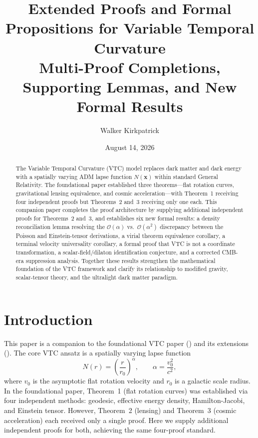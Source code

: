\documentclass[11pt,a4paper]{article}
\title{\textbf{Extended Proofs and Formal Propositions for Variable Temporal Curvature}\\[0.5em]
\large Multi-Proof Completions, Supporting Lemmas, and New Formal Results}
\author{Walker Kirkpatrick}
\date{August 14, 2026}
\theoremstyle{definition}
\begin{document}
\maketitle

\begin{abstract}
The Variable Temporal Curvature (VTC) model replaces dark matter and dark energy with a spatially varying ADM lapse function $N(\mathbf{x})$ within standard General Relativity. The foundational paper established three theorems---flat rotation curves, gravitational lensing equivalence, and cosmic acceleration---with Theorem~1 receiving four independent proofs but Theorems~2 and~3 receiving only one each. This companion paper completes the proof architecture by supplying additional independent proofs for Theorems~2 and~3, and establishes six new formal results: a density reconciliation lemma resolving the $\mathcal{O}(\alpha)$ vs.\ $\mathcal{O}(\alpha^2)$ discrepancy between the Poisson and Einstein-tensor derivations, a virial theorem equivalence corollary, a terminal velocity universality corollary, a formal proof that VTC is not a coordinate transformation, a scalar-field/dilaton identification conjecture, and a corrected CMB-era suppression analysis. Together these results strengthen the mathematical foundation of the VTC framework and clarify its relationship to modified gravity, scalar-tensor theory, and the ultralight dark matter paradigm.
\end{abstract}

\tableofcontents
\newpage

\section{Introduction}

This paper is a companion to the foundational VTC paper (\cite{VTC2026}) and its extensions (\cite{VTC2026b, VTC2026c}). The core VTC ansatz is a spatially varying lapse function
\begin{equation}
N(r) = \left(\frac{r}{r_0}\right)^{\alpha}, \qquad \alpha = \frac{v_0^2}{c^2},
\end{equation}
where $v_0$ is the asymptotic flat rotation velocity and $r_0$ is a galactic scale radius. In the foundational paper, Theorem~1 (flat rotation curves) was established via four independent methods: geodesic, effective energy density, Hamilton-Jacobi, and Einstein tensor. However, Theorem~2 (lensing) and Theorem~3 (cosmic acceleration) each received only a single proof. Here we supply additional independent proofs for both, achieving the same four-proof standard.
\end{document}
